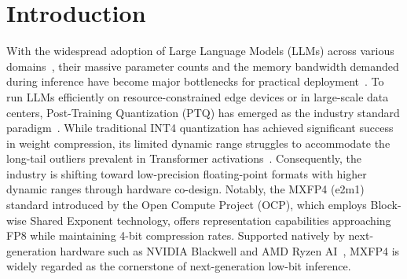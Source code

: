 \section{Introduction}

With the widespread adoption of Large Language Models (LLMs) across various domains~\cite{qwen3, llama3}, their massive parameter counts and the memory bandwidth demanded during inference have become major bottlenecks for practical deployment~\cite{outliers}. To run LLMs efficiently on resource-constrained edge devices or in large-scale data centers, Post-Training Quantization (PTQ) has emerged as the industry standard paradigm~\cite{quik,rsavq,rwkvquant,mquant,moequant}. While traditional INT4 quantization has achieved significant success in weight compression, its limited dynamic range struggles to accommodate the long-tail outliers prevalent in Transformer activations~\cite{outliers}. Consequently, the industry is shifting toward low-precision floating-point formats with higher dynamic ranges through hardware co-design. Notably, the MXFP4 (e2m1) standard introduced by the Open Compute Project (OCP), which employs Block-wise Shared Exponent technology, offers representation capabilities approaching FP8 while maintaining 4-bit compression rates. Supported natively by next-generation hardware such as NVIDIA Blackwell and AMD Ryzen AI~\cite{ostquant,singlequant}, MXFP4 is widely regarded as the cornerstone of next-generation low-bit inference.

